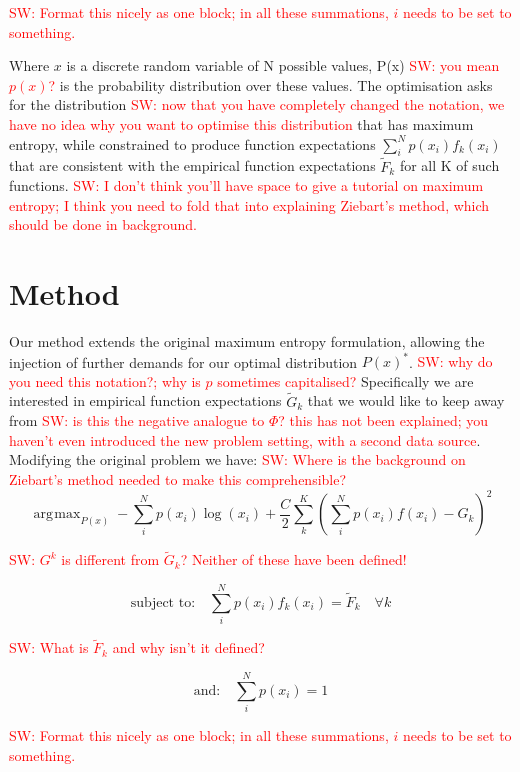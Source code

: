 \documentclass[letterpaper]{article}
\DeclareMathOperator*{\argmax}{\arg\!\max}
\newcommand{\sw}[1]{\textcolor{red}{SW: #1}}
\begin{document}
	\sw{Format this nicely as one block; in all these summations, $i$ needs to be set to something.}

	Where $x$ is a discrete random variable of N possible values, P(x) \sw{you mean $p(x)$?} is the probability distribution over these values. The optimisation asks for the distribution \sw{now that you have completely changed the notation, we have no idea why you want to optimise this distribution} that has maximum entropy, while constrained to produce function expectations $\sum_i^N p(x_i)f_k(x_i)$ that are consistent with the empirical function expectations $\widetilde{F}_k$ for all K of such functions. \sw{I don't think you'll have space to give a tutorial on maximum entropy; I think you need to fold that into explaining Ziebart's method, which should be done in background.}


\section{Method}
	Our method extends the original maximum entropy formulation, allowing the injection of further demands for our optimal distribution $P(x)^*$. \sw{why do you need this notation?; why is $p$ sometimes capitalised?} Specifically we are interested in empirical function expectations $\widetilde{G}_k$ that we would like to keep away from \sw{is this the negative analogue to $\Phi$? this has not been explained; you haven't even introduced the new problem setting, with a second data source}. Modifying the original problem we have: \sw{Where is the background on Ziebart's method needed to make this comprehensible?}  
	\begin{equation}
	\argmax_{P(x)} -\sum_i^N p(x_i)\log(x_i) + \frac{C}{2}\sum_k^K(\sum_i^N p(x_i)f(x_i) - G_k)^2
	\end{equation}
	
	\sw{$G^k$ is different from $\widetilde{G}_k$? Neither of these have been defined!}

	\begin{equation}
	\text{subject to:} \quad \sum_i^N p(x_i)f_k(x_i) = \widetilde{F}_k \quad \forall k \label{eqn:match_constraint}
	\end{equation}

\sw{What is $\widetilde{F}_k$ and why isn't it defined?}

	\begin{equation}
	\text{and:} \quad \sum_i^N p(x_i) = 1
	\end{equation}

	\sw{Format this nicely as one block; in all these summations, $i$ needs to be set to something.}
\end{document}
